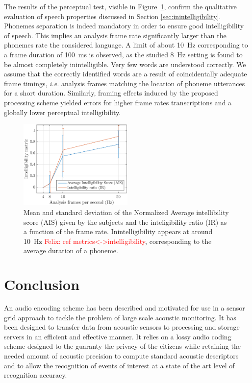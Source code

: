 \documentclass[sensors,article,submit,moreauthors,pdftex,10pt,a4paper]{mdpi}
\newcommand{\fg}[1]{\textcolor{red}{ Felix: #1}}
\begin{document}
The results of the perceptual test, visible in Figure~\ref{fig:subj_int}, confirm the qualitative evaluation of speech properties discussed in Section \ref{sec:inintelligibility}. Phonemes separation is indeed mandatory in order to ensure good intelligibility of speech. This implies an analysis frame rate significantly larger than the phonemes rate the considered language. A limit of about 10~Hz corresponding to a frame duration of 100~ms is observed, as the studied 8~Hz setting is found to be almost completely inintelligible. Very few words are understood correctly. We assume that the correctly identified words are a result of coincidentally adequate frame timings, \textit{i.e.} analysis frames matching the location of phoneme utterances for a short duration. Similarly, framing effects induced by the proposed processing scheme yielded errors for higher frame rates transcriptions and a globally lower perceptual intelligibility.\\

\begin{figure}[htbp]
	\centering
		\includegraphics[width=0.5\textwidth]{figures/subj_int.eps}
	\caption{Mean and standard deviation of the Normalized Average intellibility score (AIS) given by the subjects and the inteligibility ratio (IR) as a function of the frame rate. Inintelligibility appears at around 10~Hz\fg{ref metrics<->intelligibility}, corresponding to the average duration of a phoneme.}
	\label{fig:subj_int}
\end{figure}

\section{Conclusion}

An audio encoding scheme has been described and motivated for use in a sensor grid approach to tackle the problem of large scale acoustic monitoring. It has been designed to transfer data from acoustic sensors to processing and storage servers in an efficient and effective manner. It relies on a lossy audio coding scheme designed to the guaranty the privacy of the citizens while retaining the needed amount of acoustic precision to compute standard acoustic descriptors and to allow the recognition of events of interest at a state of the art level of recognition accuracy.
\end{document}
